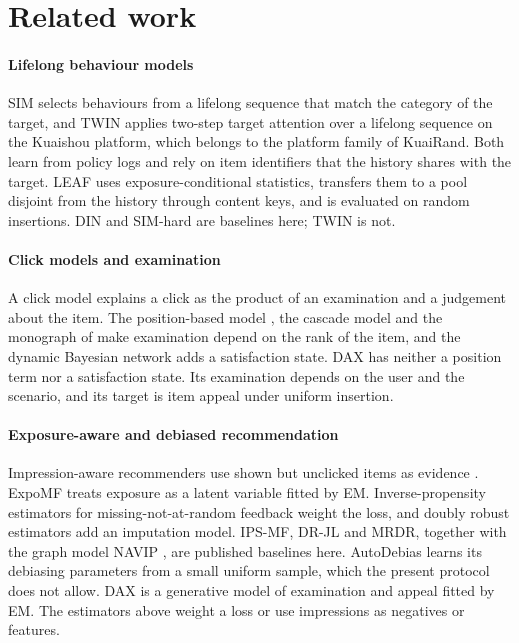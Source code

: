 \section{Related work}
\label{sec:related}

\paragraph{Lifelong behaviour models} SIM \citep{pi2020sim} selects behaviours from a lifelong sequence that match the category of
the target, and TWIN \citep{chang2023twin} applies two-step target attention over a lifelong sequence on the Kuaishou platform,
which belongs to the platform family of KuaiRand. Both learn from policy logs and rely on item identifiers that the history shares
with the target. LEAF uses exposure-conditional statistics, transfers them to a pool disjoint from the history through content keys,
and is evaluated on random insertions. DIN \citep{zhou2018din} and SIM-hard are baselines here; TWIN is not.

\paragraph{Click models and examination} A click model explains a click as the product of an examination and a judgement about the
item. The position-based model \citep{richardson2007predicting}, the cascade model \citep{craswell2008cascade} and the monograph of
\citet{chuklin2015clickmodels} make examination depend on the rank of the item, and the dynamic Bayesian network
\citep{chapelle2009dbn} adds a satisfaction state. DAX has neither a position term nor a satisfaction state. Its examination depends
on the user and the scenario, and its target is item appeal under uniform insertion.

\paragraph{Exposure-aware and debiased recommendation} Impression-aware recommenders use shown but unclicked items as evidence
\citep{perezmaurera2025iars}. ExpoMF \citep{liang2016exposure} treats exposure as a latent variable fitted by EM. Inverse-propensity
estimators for missing-not-at-random feedback \citep{saito2020unbiased,joachims2017unbiased,schnabel2016} weight the loss, and doubly
robust estimators \citep{wang2019drjl,guo2021mrdr} add an imputation model. IPS-MF, DR-JL and MRDR, together with the graph model NAVIP
\citep{kim2022navip}, are published baselines here. AutoDebias \citep{chen2021autodebias} learns its debiasing parameters from a small
uniform sample, which the present protocol does not allow. DAX is a generative model of examination and appeal fitted by EM. The
estimators above weight a loss or use impressions as negatives or features.

